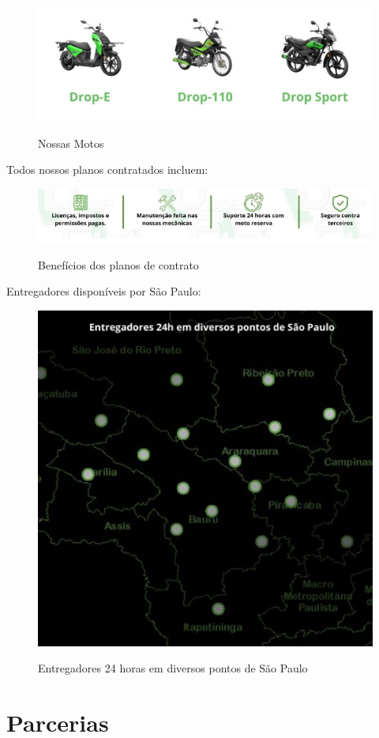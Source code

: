 \begin{figure} [!ht]
  { \centering
    \caption{Nossas Motos}
    \includegraphics[width=0.75\linewidth]{figuras/motos.png}
    \label{fig:enter-label}
    }
\end{figure}

Todos nossos planos contratados incluem:

\begin{figure} [!ht]
   { \centering
    \caption{Benefícios dos planos de contrato}
    \includegraphics[width=0.9\linewidth]{figuras/PLANO.png}
    \label{fig:enter-label}
    }
\end{figure}

Entregadores disponíveis por São Paulo:

\begin{figure} [!ht]
   { \centering
    \caption{Entregadores 24 horas em diversos pontos de São Paulo}
    \includegraphics[width=0.4\linewidth]{figuras/ENTREGADOREMSP.png}
    \label{fig:enter-label}
    }
\end{figure}

\section{Parcerias}

